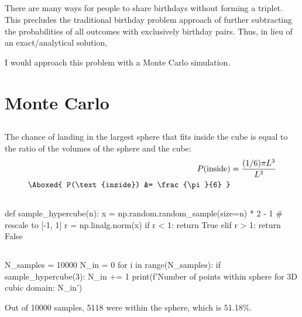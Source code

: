 \documentclass[11pt]{article}
\begin{document}
\subsection{}  %
There are many ways for people to share birthdays without forming a triplet.
This precludes the traditional birthday problem approach of further subtracting
the probabilities of all outcomes with exclusively birthday pairs. Thus, in lieu of an
exact/analytical solution,
\begin{mdframed}
    I would approach this problem with a Monte Carlo simulation.
\end{mdframed}

\section{Monte Carlo}

\subsection{}  %
The chance of landing in the largest sphere that fits inside the cube is equal
to the ratio of the volumes of the sphere and the cube:
\begin{align*}
    P(\text{inside}) &= \frac{(1/6) \pi L^3}{L^3} \\
    \Aboxed{
        P(\text{inside}) &= \frac{\pi}{6}
    }
\end{align*}

\subsection{}  %
\begin{python}[caption={},label={3blst1}]
def sample_hypercube(n):
    x = np.random.random_sample(size=n) * 2 - 1  # rescale to [-1, 1]
    r = np.linalg.norm(x)
    if r < 1:
        return True
    elif r > 1:
        return False
\end{python}

\subsection{}  %
\begin{python}[caption={},label={3clist1}]
N_samples = 10000
N_in = 0
for i in range(N_samples):
    if sample_hypercube(3):
        N_in += 1
print(f'Number of points within sphere for 3D cubic domain: {N_in}')
\end{python}
\begin{mdframed}
Out of 10000 samples, 5118 were within the sphere, which is 51.18\%.
\end{mdframed}
\end{document}

